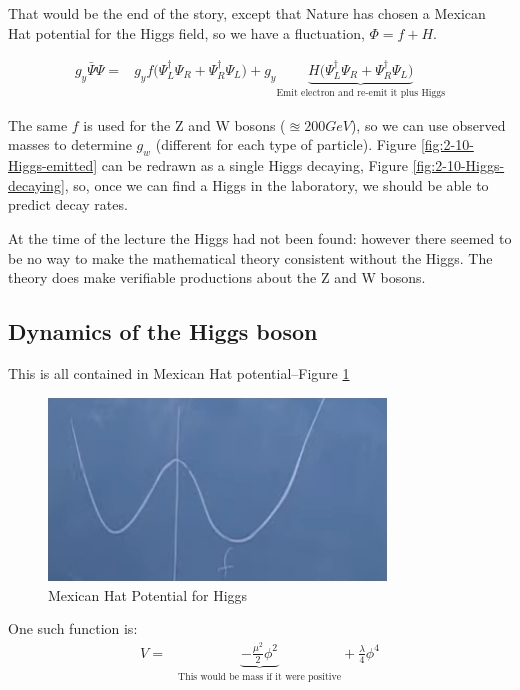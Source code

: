 \documentclass[]{article}
\begin{document}
\begin{figure}[H]
\begin{subfigure}[t]{0.45\textwidth}
	\end{subfigure}
\end{figure}

That would be the end of the story, except that Nature has chosen a Mexican Hat potential for the Higgs field, so we have a fluctuation, $\Phi=f+H$.

\begin{align*}
g_y \bar{\Psi}\Psi =& g_y f \big(\Psi^\dagger_L  \Psi_R +  \Psi^\dagger_R \Psi_L  \big) + g_y\underbrace{ H \big(\Psi^\dagger_L  \Psi_R +  \Psi^\dagger_R \Psi_L  \big)}_\text{Emit electron and re-emit it plus Higgs}
\end{align*}

The same $f$ is used for the Z and W bosons ($\approxeq200GeV$), so we can use observed masses to determine $g_w$ (different for each type of particle). Figure \ref{fig:2-10-Higgs-emitted} can be redrawn as a single Higgs decaying, Figure \ref{fig:2-10-Higgs-decaying}, so, once we can find a Higgs in the laboratory, we should be able to predict decay rates.

At the time of the lecture the Higgs had not been found: however there seemed to be no way to make the mathematical theory consistent without the Higgs. The theory does make verifiable productions about the Z and W bosons.


\subsection{Dynamics of the Higgs boson}

This is all contained in Mexican Hat potential--Figure \ref{fig:2-10-MexicanHat}
\begin{figure}[H]
	\caption{Mexican Hat Potential for Higgs}\label{fig:2-10-MexicanHat}
	\includegraphics[width=0.8\textwidth]{2-10-MexicanHat}
\end{figure}
One such function is:
\begin{align*}
	V =& \underbrace{-\frac{\mu^2}{2} \phi^2}_\text{This would be mass if it were positive} + \frac{\lambda}{4} \phi^4
\end{align*}
\end{document}
